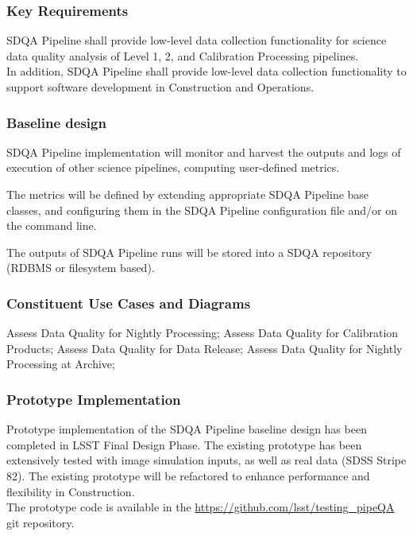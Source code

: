 \documentclass[12pt]{article}
\begin{document}
\subsubsection{Key Requirements}

SDQA Pipeline shall provide low-level data collection functionality for science data quality analysis of Level 1, 2, and Calibration Processing pipelines.
\\

In addition, SDQA Pipeline shall provide low-level data collection functionality to support software development in Construction and Operations.

\subsubsection{Baseline design}

SDQA Pipeline implementation will monitor and harvest the outputs and logs of execution of other science pipelines, computing user-defined metrics.

The metrics will be defined by extending appropriate SDQA Pipeline base classes, and configuring them in the SDQA Pipeline configuration file and/or on the command line.

The outputs of SDQA Pipeline runs will be stored into a SDQA repository (RDBMS or filesystem based).

\subsubsection{Constituent Use Cases and Diagrams}

Assess Data Quality for Nightly Processing; Assess Data Quality for Calibration Products; Assess Data Quality for Data Release;
Assess Data Quality for Nightly Processing at Archive;

\subsubsection{Prototype Implementation}

Prototype implementation of the SDQA Pipeline baseline design has been completed in LSST Final Design Phase. The existing prototype has been extensively tested with image simulation inputs, as well as real data (SDSS Stripe 82). The existing prototype will be refactored to enhance performance and flexibility in Construction.
\\

The prototype code is available in the \url{https://github.com/lsst/testing_pipeQA} git repository.
\end{document}
